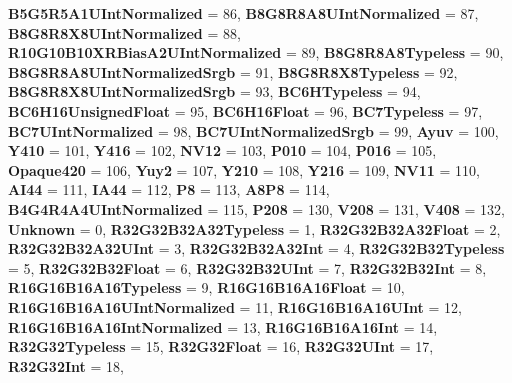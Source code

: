 \begin{DoxyCompactItemize}
{\bfseries B5\+G5\+R5\+A1\+U\+Int\+Normalized} = 86, 
{\bfseries B8\+G8\+R8\+A8\+U\+Int\+Normalized} = 87, 
{\bfseries B8\+G8\+R8\+X8\+U\+Int\+Normalized} = 88, 
{\bfseries R10\+G10\+B10\+X\+R\+Bias\+A2\+U\+Int\+Normalized} = 89, 
\newline
{\bfseries B8\+G8\+R8\+A8\+Typeless} = 90, 
{\bfseries B8\+G8\+R8\+A8\+U\+Int\+Normalized\+Srgb} = 91, 
{\bfseries B8\+G8\+R8\+X8\+Typeless} = 92, 
{\bfseries B8\+G8\+R8\+X8\+U\+Int\+Normalized\+Srgb} = 93, 
\newline
{\bfseries B\+C6\+H\+Typeless} = 94, 
{\bfseries B\+C6\+H16\+Unsigned\+Float} = 95, 
{\bfseries B\+C6\+H16\+Float} = 96, 
{\bfseries B\+C7\+Typeless} = 97, 
\newline
{\bfseries B\+C7\+U\+Int\+Normalized} = 98, 
{\bfseries B\+C7\+U\+Int\+Normalized\+Srgb} = 99, 
{\bfseries Ayuv} = 100, 
{\bfseries Y410} = 101, 
\newline
{\bfseries Y416} = 102, 
{\bfseries N\+V12} = 103, 
{\bfseries P010} = 104, 
{\bfseries P016} = 105, 
\newline
{\bfseries Opaque420} = 106, 
{\bfseries Yuy2} = 107, 
{\bfseries Y210} = 108, 
{\bfseries Y216} = 109, 
\newline
{\bfseries N\+V11} = 110, 
{\bfseries A\+I44} = 111, 
{\bfseries I\+A44} = 112, 
{\bfseries P8} = 113, 
\newline
{\bfseries A8\+P8} = 114, 
{\bfseries B4\+G4\+R4\+A4\+U\+Int\+Normalized} = 115, 
{\bfseries P208} = 130, 
{\bfseries V208} = 131, 
\newline
{\bfseries V408} = 132, 
{\bfseries Unknown} = 0, 
{\bfseries R32\+G32\+B32\+A32\+Typeless} = 1, 
{\bfseries R32\+G32\+B32\+A32\+Float} = 2, 
\newline
{\bfseries R32\+G32\+B32\+A32\+U\+Int} = 3, 
{\bfseries R32\+G32\+B32\+A32\+Int} = 4, 
{\bfseries R32\+G32\+B32\+Typeless} = 5, 
{\bfseries R32\+G32\+B32\+Float} = 6, 
\newline
{\bfseries R32\+G32\+B32\+U\+Int} = 7, 
{\bfseries R32\+G32\+B32\+Int} = 8, 
{\bfseries R16\+G16\+B16\+A16\+Typeless} = 9, 
{\bfseries R16\+G16\+B16\+A16\+Float} = 10, 
\newline
{\bfseries R16\+G16\+B16\+A16\+U\+Int\+Normalized} = 11, 
{\bfseries R16\+G16\+B16\+A16\+U\+Int} = 12, 
{\bfseries R16\+G16\+B16\+A16\+Int\+Normalized} = 13, 
{\bfseries R16\+G16\+B16\+A16\+Int} = 14, 
\newline
{\bfseries R32\+G32\+Typeless} = 15, 
{\bfseries R32\+G32\+Float} = 16, 
{\bfseries R32\+G32\+U\+Int} = 17, 
{\bfseries R32\+G32\+Int} = 18, 
\newline

\end{DoxyCompactItemize}
